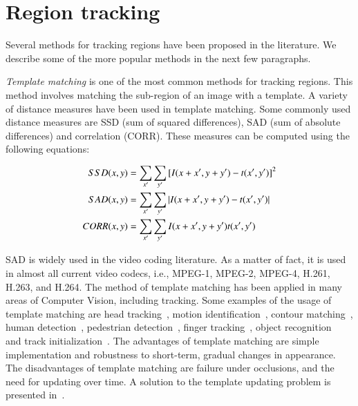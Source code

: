 \section{Region tracking}
Several methods for tracking regions have been proposed in the literature.  We describe some of the more popular methods in the next few paragraphs.

\emph{Template matching} is one of the most common methods for tracking regions.  This method involves matching the sub-region of an image with a template.  A variety of distance measures have been used in template matching.  Some commonly used distance measures are SSD (sum of squared differences), SAD (sum of absolute differences) and correlation (CORR).  These measures can be computed using the following equations:


\begin{align}
SSD(x,y)  &=\sum_{x'}\sum_{y'} {[I(x+x', y+y')-t(x', y')]}^2 \notag\\
SAD(x,y)  &=\sum_{x'}\sum_{y'} |I(x+x', y+y')-t(x', y')| \\
CORR(x,y) &=\sum_{x'}\sum_{y'} I(x+x', y+y') t(x', y') \notag
\end{align}

SAD is widely used in the video coding literature.  As a matter of fact, it is used in almost all current video codecs, i.e., MPEG-1, MPEG-2, MPEG-4, H.261, H.263, and H.264.  The method of template matching has been applied in many areas of Computer Vision, including tracking.  Some examples of the usage of template matching are head tracking~\cite{1998_CNF_HeadTracking_Birchfield}, motion identification~\cite{1998_CNF_Tracking_Lipton, 2001_JNL_MotionTemplates_Bobick}, contour matching~\cite{2009_CNF_HumanDetection_Beleznai}, human detection~\cite{2010_JNL_HumanDetectionSegmentation_Lin}, pedestrian detection~\cite{1997_CNF_PedestrianDetection_Oren}, finger tracking~\cite{1995_CNF_Tracking_Rehg}, object recognition~\cite{2000_CNF_MLtemplateMatching_Olson} and track initialization~\cite{1998_CNF_Tracking_Lipton, 2010_CNF_TrkRVQ_Aslam}.  The advantages of template matching are simple implementation and robustness to short-term, gradual changes in appearance.  The disadvantages of template matching are failure under occlusions, and the need for updating over time.  A solution to the template updating problem is presented in~\cite{1998_CNF_Tracking_Lipton}.


